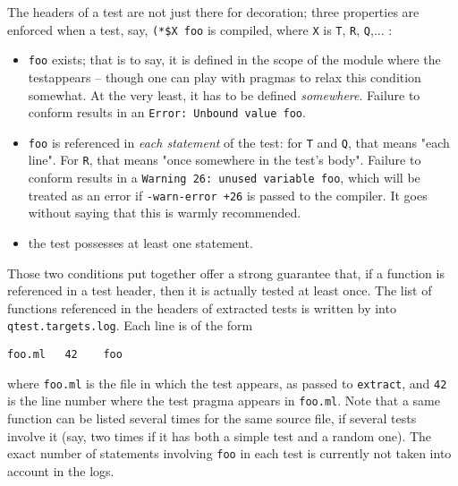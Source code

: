 
The headers of a test are not just there for decoration; three properties are enforced
when a test, say, \texttt{(*\$X foo} is compiled, where \texttt{X} is
\texttt{T}, \texttt{R}, \texttt{Q},... :

\begin{itemize}

\item  \texttt{foo} exists; that is to say, it is defined in the scope of the module where the testappears -- though one can play with pragmas to relax this condition somewhat. At the very
least, it has to be defined \emph{somewhere}. Failure to conform results in an \texttt{Error: Unbound
value foo}.

\item \texttt{foo} is referenced in \emph{each statement} of the test:
  for \texttt{T} and \texttt{Q}, that means "each line". For
  \texttt{R}, that means "once somewhere in the test's body". Failure
  to conform results in a \texttt{Warning 26: unused variable foo},
  which will be treated as an error if \texttt{-warn-error +26} is
  passed to the compiler. It goes without saying that this is warmly
  recommended.

\item  the test possesses at least one statement.
\end{itemize}

Those two conditions put together offer a strong guarantee that, if a function is
referenced in a test header, then it is actually tested at least once. The list of
functions referenced in the headers of extracted tests is written by \qtest{} into
\texttt{qtest.targets.log}. Each line is of the form

\begin{verbatim}
foo.ml   42    foo
\end{verbatim}

where \texttt{foo.ml} is the file in which the test appears, as passed to \texttt{extract},
 and \texttt{42} is
the line number where the test pragma appears in \texttt{foo.ml}. Note that a same function can be
listed several times for the same source file, if several tests involve it (say, two times
if it has both a simple test and a random one). The exact number of statements involving
\texttt{foo} in each test is currently not taken into account in the logs.
